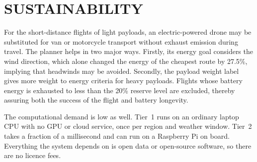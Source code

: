 \section{SUSTAINABILITY}

For the short-distance flights of light payloads, an electric-powered drone may be
substituted for van or motorcycle transport without exhaust emission during travel. The
planner helps in two major ways. Firstly, its energy goal considers the wind direction,
which alone changed the energy of the cheapest route by 27.5\%, implying that headwinds
may be avoided. Secondly, the payload weight label gives more weight to energy criteria
for heavy payloads. Flights whose battery energy is exhausted to less than the 20\%
reserve level are excluded, thereby assuring both the success of the flight and battery
longevity.

The computational demand is low as well. Tier~1 runs on an ordinary laptop CPU with no
GPU or cloud service, once per region and weather window. Tier~2 takes a fraction of a
millisecond and can run on a Raspberry Pi on board. Everything the system depends on is open data or open-source software, so there are no licence fees.
